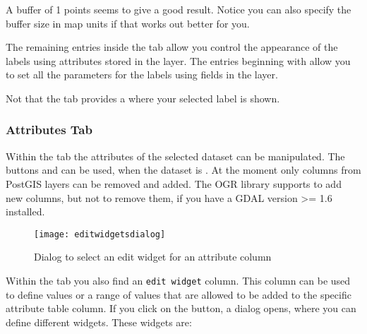 A buffer of 1 points seems to give a good result.
Notice you can also specify the buffer size in map units if that works out
better for you.

The remaining entries inside the  tab allow you control the appearance of the
labels using attributes stored in the layer. The entries beginning with  allow you to
set all the parameters for the labels using fields in the layer.

Not that the  tab provides a  where your
selected label is shown.

\subsubsection{Attributes Tab}\label{label_attributes}

Within the  tab the attributes of the selected dataset can be
manipulated. The buttons  and
 can be
used, when the dataset is .
At the moment only columns from PostGIS layers can be removed and added. The
OGR library supports to add new columns, but not to remove them, if you have
a GDAL version >= 1.6 installed.


\begin{figure}[H]
   \begin{center}
   \caption{Dialog to select an edit widget for an attribute column
\nixcaption}\label{fig:editwidget}\smallskip
   \texttt{[image: editwidgetsdialog]}
\end{center}
\end{figure}

Within the  tab you also find an \texttt{edit widget} column.
This column can be used to define values or a range of values that are
allowed
to be added to the specific attribute table column. If you click on the
 button, a dialog opens, where you can define different
widgets. These widgets are:

